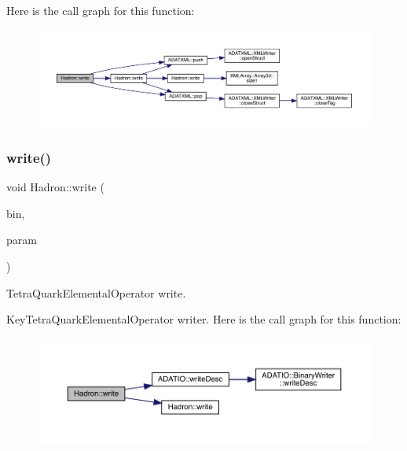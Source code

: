 Here is the call graph for this function\+:\nopagebreak
\begin{figure}[H]
\begin{center}
\leavevmode
\includegraphics[width=350pt]{d1/daf/namespaceHadron_aeeb688cdcca0a8494272d68cf2f15481_cgraph}
\end{center}
\end{figure}
\mbox{\label{namespaceHadron_a4fefcfe0419c7e64ff031011643eb810}} 
\subsubsection{\texorpdfstring{write()}{write()}\hspace{0.1cm}{\footnotesize\ttfamily [39/95]}}
{\footnotesize\ttfamily void Hadron\+::write (\begin{DoxyParamCaption}\item[{\mbox{\hyperlink{classADATIO_1_1BinaryWriter}{Binary\+Writer}} \&}]{bin,  }\item[{const \mbox{\hyperlink{structHadron_1_1KeyTetraQuarkElementalOperator__t}{Key\+Tetra\+Quark\+Elemental\+Operator\+\_\+t}} \&}]{param }\end{DoxyParamCaption})}



Tetra\+Quark\+Elemental\+Operator write. 

Key\+Tetra\+Quark\+Elemental\+Operator writer. Here is the call graph for this function\+:\nopagebreak
\begin{figure}[H]
\begin{center}
\leavevmode
\includegraphics[width=350pt]{d1/daf/namespaceHadron_a4fefcfe0419c7e64ff031011643eb810_cgraph}
\end{center}
\end{figure}
\mbox{\label{namespaceHadron_abb7bfe7ab47ecc24ac8d489bdaf701d2}} 
